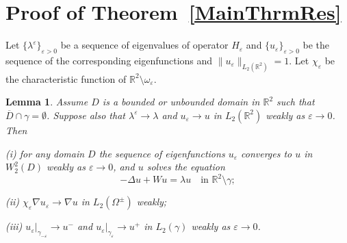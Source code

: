 \documentclass[reqno]{amsart}
\theoremstyle{plain}
\newtheorem{lem}{Lemma}
\numberwithin{equation}{section}
\newcommand{\Real}{\mathbb R}
\newcommand{\eps}{\varepsilon}
\begin{document}
\section{Proof of  Theorem~\ref{MainThrmRes}}
Let $\{\lambda^\eps\}_{\eps>0}$ be a sequence of eigenvalues of operator $H_\eps$ and $\{u_\eps\}_{\eps>0}$ be the sequence of the corresponding eigenfunctions and $\|u_\eps\|_{L_2(\Real^2)}=1$. Let $\chi_{\eps}$ be the characteristic function of $\Real^2\setminus\omega_\eps$.

\begin{lem}\label{LemmaDconv}
  Assume $D$ is a bounded or unbounded domain in $\Real^2$ such that $\overline{D}\cap\gamma=\emptyset$. Suppose also
  that $\lambda^\eps\to \lambda$ and $u_\eps\to u$ in $L_2(\Real^2)$ weakly as $\eps\to 0$. Then

  (i) for any domain $D$ the sequence of eigenfunctions $u_\eps$ converges to $u$ in $W_2^2(D)$ weakly as $\eps\to 0$, and  $u$ solves the equation
  \begin{equation}\label{EqnForUoutside}
  -\Delta u+Wu=\lambda u\quad \text{in } \Real^2\setminus \gamma;
  \end{equation}

  (ii) $\chi_{\eps}\nabla u_\eps\to\nabla u$ in $L_2(\Omega^\pm)$ weakly;


 (iii) $u_\eps|_{\gamma_{-\eps}}\to u^-$ and  $u_\eps|_{\gamma_{\eps}}\to u^+$ in $L_2(\gamma)$ weakly as $\eps\to 0$.
\end{lem}
\end{document}

